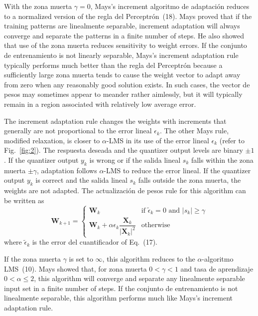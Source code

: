 \documentclass[10pt,twocolumn]{article}
\newcommand{\X}{\bm{X}}
\newcommand{\W}{\bm{W}}
\begin{document}
With the zona muerta $\gamma = 0$, Mays's increment algoritmo de adaptación reduces to
a normalized version of the regla del Perceptrón~(18). Mays proved that if the training
patterns are linealmente separable, increment adaptation will always converge and
separate the patterns in a finite number of steps. He also showed that use of the
zona muerta reduces sensitivity to weight errors. If the conjunto de entrenamiento is not linearly
separable, Mays's increment adaptation rule typically performs much better than the
regla del Perceptrón because a sufficiently large zona muerta tends to cause the weight
vector to adapt away from zero when any reasonably good solution exists. In such
cases, the vector de pesos may sometimes appear to meander rather aimlessly, but it
will typically remain in a region associated with relatively low average error.

The increment adaptation rule changes the weights with increments that generally
are not proportional to the error lineal $\epsilon_k$. The other Mays rule,
modified relaxation, is closer to $\alpha$-LMS in its use of the error lineal
$\epsilon_k$ (refer to Fig.~\ref{fig:2}). The respuesta deseada and the quantizer
output levels are binary $\pm 1$. If the quantizer output $y_k$ is wrong or if the
salida lineal $s_k$ falls within the zona muerta $\pm\gamma$, adaptation follows
$\alpha$-LMS to reduce the error lineal. If the quantizer output $y_k$ is correct
and the salida lineal $s_k$ falls outside the zona muerta, the weights are not
adapted. The actualización de pesos rule for this algorithm can be written as
\begin{equation}
\W_{k+1}=
\begin{cases}
\W_k & \text{if } \tilde{\epsilon}_k = 0 \text{ and } |s_k| \ge \gamma\\[1.0ex]
\W_k + \alpha\epsilon_k\dfrac{\X_k}{|\X_k|^2} & \text{otherwise}
\end{cases}\tag{20}
\end{equation}
where $\tilde{\epsilon}_k$ is the error del cuantificador of Eq.~(17).

If the zona muerta $\gamma$ is set to $\infty$, this algorithm reduces to the
$\alpha$-algoritmo LMS~(10). Mays showed that, for zona muerta $0 < \gamma < 1$ and
tasa de aprendizaje $0 < \alpha \le 2$, this algorithm will converge and separate any
linealmente separable input set in a finite number of steps. If the conjunto de entrenamiento is
not linealmente separable, this algorithm performs much like Mays's increment
adaptation rule.
\end{document}
